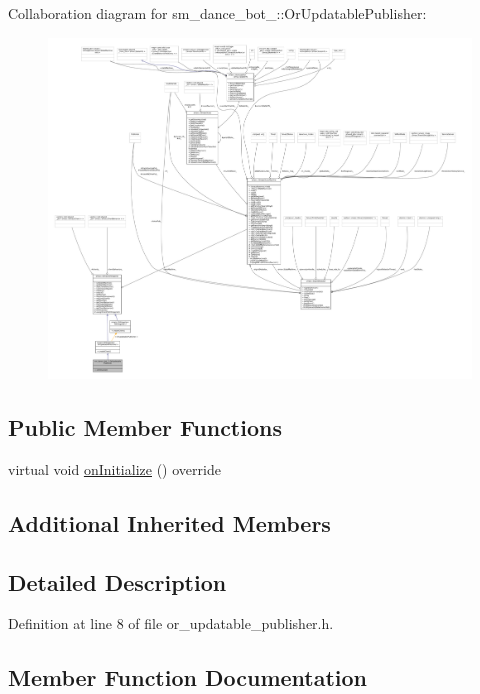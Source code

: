 Collaboration diagram for sm\+\_\+dance\+\_\+bot\+\_\+:\+:Or\+Updatable\+Publisher\+:
\nopagebreak
\begin{figure}[H]
\begin{center}
\leavevmode
\includegraphics[width=350pt]{classsm__dance__bot__2_1_1OrUpdatablePublisher__coll__graph}
\end{center}
\end{figure}
\subsection*{Public Member Functions}
\begin{DoxyCompactItemize}
\item 
virtual void \hyperlink{classsm__dance__bot__2_1_1OrUpdatablePublisher_af4fc4331ca956bcf7a2106464bbd06e7}{on\+Initialize} () override
\end{DoxyCompactItemize}
\subsection*{Additional Inherited Members}


\subsection{Detailed Description}


Definition at line 8 of file or\+\_\+updatable\+\_\+publisher.\+h.



\subsection{Member Function Documentation}
\mbox{\label{classsm__dance__bot__2_1_1OrUpdatablePublisher_af4fc4331ca956bcf7a2106464bbd06e7}} 
